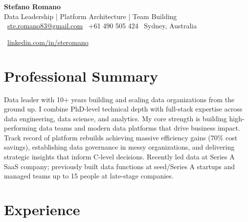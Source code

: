 \documentclass[10pt,a4paper]{article}
\begin{document}
\begin{center}
    {\Huge\bfseries\color{darkgray} Stefano Romano} \\[5pt]
    {\large\color{accentcolor} Data Leadership | Platform Architecture | Team Building} \\[8pt]
    {\small
    \faEnvelope\ \href{mailto:ste.romano83@gmail.com}{ste.romano83@gmail.com} \quad
    \faPhone\ +61 490 505 424 \quad
    \faMapMarker\ Sydney, Australia}
\end{center}
\vspace{3pt}

\begin{center}
    {\small
    \faLinkedin\ \href{https://linkedin.com/in/steromano}{linkedin.com/in/steromano}}
\end{center}
\vspace{3pt}

\section*{Professional Summary}
Data leader with 10+ years building and scaling data organizations from the ground up. I combine PhD-level technical depth with full-stack expertise across data engineering, data science, and analytics. My core strength is building high-performing data teams and modern data platforms that drive business impact. Track record of platform rebuilds achieving massive efficiency gains (70\% cost savings), establishing data governance in messy organizations, and delivering strategic insights that inform C-level decisions. Recently led data at Series A SaaS company; previously built data functions at seed/Series A startups and managed teams up to 15 people at late-stage companies.

\section*{Experience}
\end{document}
